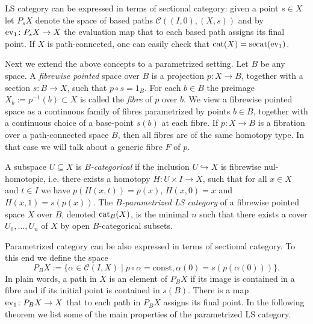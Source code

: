 \documentclass[11pt]{amsart}
\theoremstyle{plain}
\theoremstyle{definition}
\newcommand{\ev}{\mathop{\rm ev}\nolimits}
\newcommand{\cat}{\mathop{\rm cat}\nolimits}
\newcommand{\secat}{\mathop{\rm secat}\nolimits}
\begin{document}
LS category can be expressed in terms of sectional category: given a point $s\in X$ let $P_sX$ denote 
the space of based paths $\mathcal{C}((I,0),(X,s))$ and by $\ev_1\colon P_sX \to X$ the evaluation map 
that to each based path assigns its final point. If $X$ is path-connected, one can easily check that 
$\cat(X)=\secat(\ev_1)$.

Next we extend the above concepts to a parametrized setting.
Let $B$ be any space. A \emph{fibrewise pointed} space over $B$ is a projection $p\colon X\to B$,
together with a section $s\colon B\to X$, such that $p\circ s=1_B$. For each $b\in B$ the preimage
$X_b:=p^{-1}(b)\subset X$ is called the \emph{fibre} of $p$ over $b$. We view a fibrewise pointed
space as a continuous family of fibres parametrized by points $b\in B$, together with 
a continuous choice of a base-point 
$s(b)$ at each fibre. If $p\colon X\to B$ is a fibration over a path-connected space $B$, 
then all fibres
are of the same homotopy type. In that case we will talk about a generic fibre $F$ of $p$. 

A subspace $U\subseteq X$ is \emph{$B$-categorical} if the inclusion $U\hookrightarrow X$ is 
fibrewise nul-homotopic, i.e. there exists a homotopy $H\colon U\times I\to X$, such that 
for all $x\in X$ and $t\in I$ we have $p(H(x,t))=p(x)$, $H(x,0)=x$ and $H(x,1)=s(p(x))$. 
The \emph{$B$-parametrized LS category} of a fibrewise pointed space $X$ over $B$, denoted $\cat_B(X)$, 
is the minimal $n$ such that there exists a cover $U_0,\ldots,U_n$ of $X$ by open 
$B$-categorical subsets.

Parametrized category can be also expressed in terms of sectional category. To this end we define 
the space 
$$P_BX:=\{\alpha\in\mathcal{C}(I,X)\mid p\circ\alpha=\mathrm{const}, \alpha(0)=s(p(\alpha(0))) \}.$$
In plain words, a path in $X$ is an element of $P_BX$ if its image is contained in a fibre and if its
initial point is contained in $s(B)$. There is a map $\ev_1\colon P_BX\to X$ that to each path
in $P_BX$ assigns its final point. In the following theorem we list some of the main properties of the 
parametrized LS category.
\end{document}
